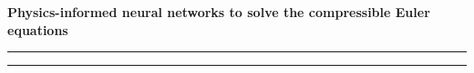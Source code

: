 \documentclass[aspectratio=169]{beamer}
\begin{document}
\begin{frame}\frametitle{}

\vspace*{0.3in}

\textrm{{\huge\bfseries\color{myOrange} Physics-informed neural networks to solve the compressible Euler equations}}

\vspace*{0.2in}
\hrule

\hrule

\vspace*{0.1in}
\hfill{} \\

\end{frame}
\end{document}
